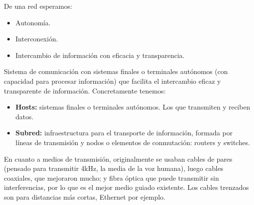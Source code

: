 De una red esperamos:
\begin{itemize}
    \item Autonomía.
    \item Interconexión.
    \item Intercambio de información con eficacia y transparencia. 
\end{itemize}



\begin{definicion}[Red]
    Sistema de comunicación con sistemas finales o terminales autónomos (con capacidad para procesar información) que facilita el intercambio eficaz y transparente de información. Concretamente tenemos:

    \begin{itemize}
        \item\textbf{Hosts:} sistemas finales o terminales autónomos. Los que transmiten y reciben datos. 
        \item\textbf{Subred:} infraestructura para el transporte de información, formada por líneas de transmisión y nodos o elementos de conmutación: routers y switches.   
    \end{itemize}

    En cuanto a medios de transmisión, originalmente se usaban cables de pares (pensado para transmitir 4kHz, la media de la voz humana), luego cables coaxiales, que mejoraron mucho; y fibra óptica que puede transmitir sin interferencias, por lo que es el mejor medio guiado existente. Los cables trenzados son para distancias más cortas, Ethernet por ejemplo. 
\end{definicion}


